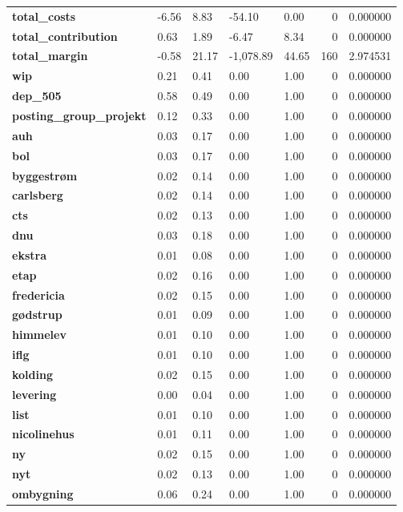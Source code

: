 \begin{longtable}{lllllrr}
\textbf{total\_costs} & -6.56 & 8.83 & -54.10 & 0.00 & 0 & 0.000000 \\
\textbf{total\_contribution} & 0.63 & 1.89 & -6.47 & 8.34 & 0 & 0.000000 \\
\textbf{total\_margin} & -0.58 & 21.17 & -1,078.89 & 44.65 & 160 & 2.974531 \\
\textbf{wip} & 0.21 & 0.41 & 0.00 & 1.00 & 0 & 0.000000 \\
\textbf{dep\_505} & 0.58 & 0.49 & 0.00 & 1.00 & 0 & 0.000000 \\
\textbf{posting\_group\_projekt} & 0.12 & 0.33 & 0.00 & 1.00 & 0 & 0.000000 \\
\textbf{auh} & 0.03 & 0.17 & 0.00 & 1.00 & 0 & 0.000000 \\
\textbf{bol} & 0.03 & 0.17 & 0.00 & 1.00 & 0 & 0.000000 \\
\textbf{byggestrøm} & 0.02 & 0.14 & 0.00 & 1.00 & 0 & 0.000000 \\
\textbf{carlsberg} & 0.02 & 0.14 & 0.00 & 1.00 & 0 & 0.000000 \\
\textbf{cts} & 0.02 & 0.13 & 0.00 & 1.00 & 0 & 0.000000 \\
\textbf{dnu} & 0.03 & 0.18 & 0.00 & 1.00 & 0 & 0.000000 \\
\textbf{ekstra} & 0.01 & 0.08 & 0.00 & 1.00 & 0 & 0.000000 \\
\textbf{etap} & 0.02 & 0.16 & 0.00 & 1.00 & 0 & 0.000000 \\
\textbf{fredericia} & 0.02 & 0.15 & 0.00 & 1.00 & 0 & 0.000000 \\
\textbf{gødstrup} & 0.01 & 0.09 & 0.00 & 1.00 & 0 & 0.000000 \\
\textbf{himmelev} & 0.01 & 0.10 & 0.00 & 1.00 & 0 & 0.000000 \\
\textbf{iflg} & 0.01 & 0.10 & 0.00 & 1.00 & 0 & 0.000000 \\
\textbf{kolding} & 0.02 & 0.15 & 0.00 & 1.00 & 0 & 0.000000 \\
\textbf{levering} & 0.00 & 0.04 & 0.00 & 1.00 & 0 & 0.000000 \\
\textbf{list} & 0.01 & 0.10 & 0.00 & 1.00 & 0 & 0.000000 \\
\textbf{nicolinehus} & 0.01 & 0.11 & 0.00 & 1.00 & 0 & 0.000000 \\
\textbf{ny} & 0.02 & 0.15 & 0.00 & 1.00 & 0 & 0.000000 \\
\textbf{nyt} & 0.02 & 0.13 & 0.00 & 1.00 & 0 & 0.000000 \\
\textbf{ombygning} & 0.06 & 0.24 & 0.00 & 1.00 & 0 & 0.000000 \\

\end{longtable}
